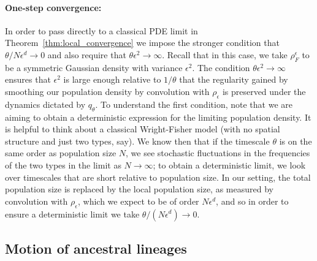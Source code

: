 \documentclass[12pt]{article}
\numberwithin{equation}{section}
\begin{document}
\paragraph{One-step convergence:}
In order to pass directly to a classical PDE limit
in Theorem~\ref{thm:local_convergence}
we impose the stronger condition
that $\theta/N\epsilon^d\to 0$ and also require that
$\theta\epsilon^2\to\infty$. 
Recall that in this case, we take $\rho_F^\epsilon$ 
to be a symmetric Gaussian density with variance 
$\epsilon^2$. The condition $\theta\epsilon^2\to\infty$ 
ensures that $\epsilon^2$ is large enough relative to $1/\theta$
that the regularity gained by smoothing our population density by convolution with
$\rho_\epsilon$ is preserved under the dynamics dictated by $q_{\theta}$.
To understand the first condition, note that we are aiming to obtain a 
deterministic expression for the limiting population density. 
It is helpful to think
about a classical Wright-Fisher model (with no spatial structure and just two types, say). 
We know then that if the
timescale $\theta$ is on the same order as population size $N$, we see stochastic
fluctuations in the frequencies of the two types in the limit as $N\to\infty$; to 
obtain a deterministic limit, we look over timescales that are short relative to population
size. In our setting, the total population size is replaced by the local population
size, as measured by convolution with $\rho_{\epsilon}$, which we expect to be 
of order $N\epsilon^d$, and so in order to ensure a deterministic limit we 
take $\theta/(N\epsilon^d)\to 0$.


\subsection{Motion of ancestral lineages}
\end{document}
